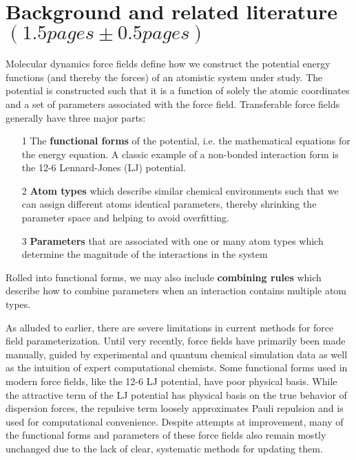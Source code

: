 \documentclass[rmp,nofootinbib,superscriptaddress,12pt,tightenlines,notitlepage]{revtex4-1}
\begin{document}
\section{Background and related literature $\left(1.5 pages \pm 0.5 pages\right)$}
Molecular dynamics force fields define how we construct the potential energy functions (and thereby the forces) of an atomistic system under study. The potential is constructed such that it is a function of solely the atomic coordinates and a set of parameters associated with the force field. Transferable force fields generally have three major parts: 
  \begin{itemize}
   \item [1] The \textbf{functional forms} of the potential, i.e. the mathematical equations for the energy equation. A classic example of a non-bonded interaction form is the 12-6 Lennard-Jones (LJ) potential.   
   \item [2] \textbf{Atom types} which describe similar chemical environments such that we can assign different atoms identical parameters, thereby shrinking the parameter space and helping to avoid overfitting.
   \item [3] \textbf{Parameters} that are associated with one or many atom types which determine the magnitude of the interactions in the system 
  \end{itemize}
Rolled into functional forms, we may also include \textbf{combining rules} which describe how to combine parameters when an interaction contains multiple atom types.

As alluded to earlier, there are severe limitations in current methods for force field parameterization. Until very recently, force fields have primarily been made manually, guided by experimental and quantum chemical simulation data as well as the intuition of expert computational chemists.\cite{charmm1,charmm2,mm2,mmff,amber} Some functional forms used in modern force fields, like the 12-6 LJ potential, have poor physical basis. While the attractive term of the LJ potential has physical basis on the true behavior of dispersion forces, the repulsive term loosely approximates Pauli repulsion and is used for computational convenience. Despite attempts at improvement, many of the functional forms and parameters of these force fields also remain mostly unchanged due to the lack of clear, systematic methods for updating them.\cite{unchanged}
\end{document}
